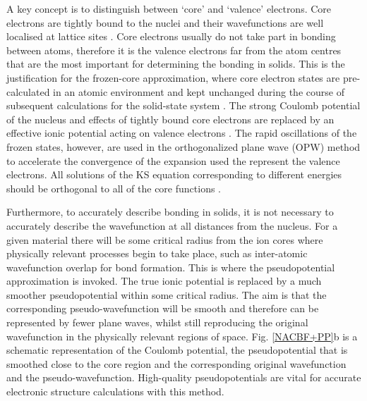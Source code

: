 \documentclass[11pt, twoside]{report}
\begin{document}
A key concept is to distinguish between `core' and `valence' electrons. Core electrons are tightly bound to the nuclei and their wavefunctions are well localised at lattice sites \cite{Prasad_ch5}. Core electrons usually do not take part in bonding between atoms, therefore it is the valence electrons far from the atom centres that are the most important for determining the bonding in solids. This is the justification for the frozen-core approximation, where core electron states are pre-calculated in an atomic environment and kept unchanged during the course of subsequent calculations for the solid-state system \cite{vasp_slides_PP1}. The strong Coulomb potential of the nucleus and effects of tightly bound core electrons are replaced by an effective ionic potential acting on valence electrons \cite{RichardMartin_Ch11}. The rapid oscillations of the frozen states, however, are used in the orthogonalized plane wave (OPW) method to accelerate the convergence of the expansion used the represent the valence electrons. All solutions of the KS equation corresponding to different energies should be orthogonal to all of the core functions \cite{Prasad_ch5}.


Furthermore, to accurately describe bonding in solids, it is not necessary to accurately describe the wavefunction at all distances from the nucleus. For a given material there will be some critical radius from the ion cores where physically relevant processes begin to take place, such as inter-atomic wavefunction overlap for bond formation. This is where the pseudopotential approximation is invoked. The true ionic potential is replaced by a much smoother pseudopotential within some critical radius. The aim is that the corresponding pseudo-wavefunction will be smooth and therefore can be represented by fewer plane waves, whilst still reproducing the original wavefunction in the physically relevant regions of space. Fig. \ref{NACBF+PP}b is a schematic representation of the Coulomb potential, the pseudopotential that is smoothed close to the core region and the corresponding original wavefunction and the pseudo-wavefunction. High-quality pseudopotentials are vital for accurate electronic structure calculations with this method. 
\end{document}
